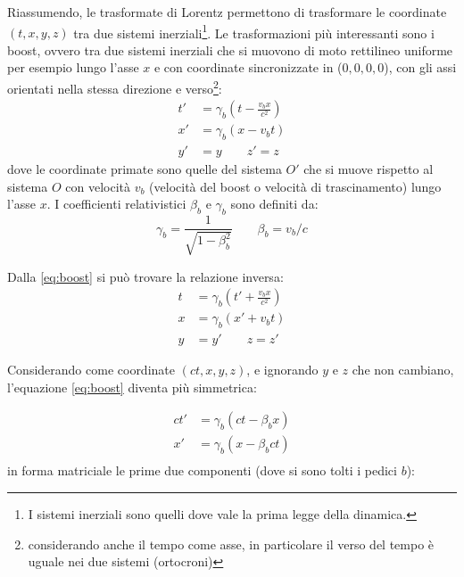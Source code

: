 Riassumendo, le trasformate di Lorentz permettono di trasformare le coordinate $(t, x, y, z)$ tra due sistemi inerziali\footnote{I sistemi inerziali sono quelli dove vale la prima legge della dinamica.}. Le trasformazioni più interessanti sono i boost, ovvero tra due sistemi inerziali che si muovono di moto rettilineo uniforme per esempio lungo l'asse $x$ e con coordinate sincronizzate in ($0,0,0,0$), con gli assi orientati nella stessa direzione e verso\footnote{considerando anche il tempo come asse, in particolare il verso del tempo è uguale nei due sistemi (ortocroni)}:
\begin{equation}
   \begin{split}
      t' &= \gamma_b \left(t - \frac{v_b x}{c^2}\right) \\
      x' &= \gamma_b \left(x - v_b t\right) \\
      y' &= y \qquad z'=z
   \end{split}
   \label{eq:boost}
\end{equation}
dove le coordinate primate sono quelle del sistema $O'$ che si muove rispetto al sistema $O$ con velocità $v_b$ (velocità del boost o velocità di trascinamento) lungo l'asse $x$. I coefficienti relativistici $\beta_b$ e $\gamma_b$ sono definiti da:
\begin{equation}
   \gamma_b = \frac{1}{\sqrt{1 - \beta_b^2}} \qquad \beta_b = v_b / c
\end{equation}


Dalla \eqref{eq:boost} si può trovare la relazione inversa:
\begin{equation}
   \begin{split}
      t &= \gamma_b \left(t' + \frac{v_b x}{c^2}\right) \\
      x &= \gamma_b \left(x' + v_b t\right) \\
      y &= y' \qquad z=z'
   \end{split}
   \label{eq:boostinv}
\end{equation}

Considerando come coordinate $(ct, x, y, z)$, e ignorando $y$ e $z$ che non cambiano, l'equazione \eqref{eq:boost} diventa più simmetrica:

\begin{equation}
   \begin{split}
      ct' &= \gamma_b (ct - \beta_b x) \\
      x' &= \gamma_b (x - \beta_b ct) \\
   \end{split}
\end{equation}
in forma matriciale le prime due componenti (dove si sono tolti i pedici $b$):

